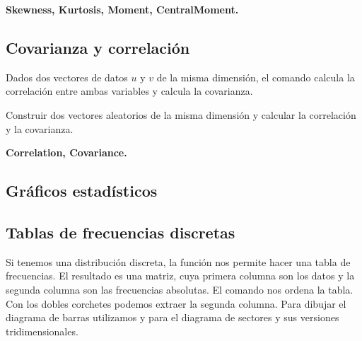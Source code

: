 \documentclass[a4paper,10pt, draft]{article}
\newcommand{\com}[1]{\textbf{\color{blue}{#1}}}
\newenvironment{capitulo}{\begin{tcolorbox}[colback=red!5!white,colframe=red!75!black]}{\end{tcolorbox}\bigskip}
\newenvironment{ejer}{\begin{tcolorbox}[center title, title=Ejercicios,
fonttitle=\sffamily\bfseries,colback=blue!5,colframe=orange]}{\end{tcolorbox}}
\newenvironment{funciones}{\begin{tcolorbox}[center title, title=Nuevas funciones, fonttitle=\sffamily\bfseries, colback=green!5!white,colframe=red!75!black]}{\end{tcolorbox}\bigskip}
\begin{document}
\begin{funciones}

\textbf{Skewness, Kurtosis, Moment, CentralMoment.}

\end{funciones}



\newpage

\subsection{Covarianza y correlación}

Dados dos vectores de datos $u$ y $v$ de la misma dimensión, el comando \com{Correlation[u,v]} calcula la correlación entre ambas variables y \com{Covariance[u,v]} calcula la covarianza.


\begin{ejer}

Construir dos vectores aleatorios de la misma dimensión y calcular la correlación y la covarianza.



\end{ejer}


\begin{funciones}

\textbf{Correlation, Covariance.}

\end{funciones}

\newpage


\begin{capitulo}

\section{Gráficos estadísticos}

\end{capitulo}

\subsection{Tablas de frecuencias discretas}


Si tenemos una distribución  discreta, la función \com{Tally[v]} nos permite hacer una tabla de frecuencias. El resultado es una matriz, cuya primera columna son los datos y la segunda columna son las frecuencias absolutas. El comando \com{Sort[v]} nos ordena la tabla. Con los dobles corchetes podemos extraer la segunda columna. Para dibujar el diagrama de barras utilizamos \com{BarChart[v]} y para el diagrama de sectores \com{PieChart[v]} y sus versiones tridimensionales.
\end{document}
